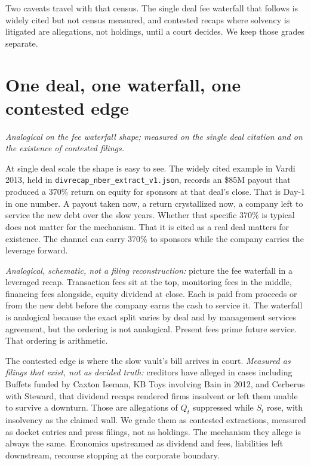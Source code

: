 Two caveats travel with that census. The single deal fee waterfall that follows is widely cited but not census measured, and contested recaps where solvency is litigated are allegations, not holdings, until a court decides. We keep those grades separate.

\section{One deal, one waterfall, one contested edge}

\textit{Analogical on the fee waterfall shape; measured on the single deal citation and on the existence of contested filings.}

At single deal scale the shape is easy to see. The widely cited example in Vardi 2013, held in \texttt{divrecap\_nber\_extract\_v1.json}, records an \$85M payout that produced a 370\% return on equity for sponsors at that deal's close. That is Day-1 in one number. A payout taken now, a return crystallized now, a company left to service the new debt over the slow years. Whether that specific 370\% is typical does not matter for the mechanism. That it is cited as a real deal matters for existence. The channel can carry 370\% to sponsors while the company carries the leverage forward.

\textit{Analogical, schematic, not a filing reconstruction:} picture the fee waterfall in a leveraged recap. Transaction fees sit at the top, monitoring fees in the middle, financing fees alongside, equity dividend at close. Each is paid from proceeds or from the new debt before the company earns the cash to service it. The waterfall is analogical because the exact split varies by deal and by management services agreement, but the ordering is not analogical. Present fees prime future service. That ordering is arithmetic.

The contested edge is where the slow vault's bill arrives in court. \textit{Measured as filings that exist, not as decided truth:} creditors have alleged in cases including Buffets funded by Caxton Iseman, KB Toys involving Bain in 2012, and Cerberus with Steward, that dividend recaps rendered firms insolvent or left them unable to survive a downturn. Those are allegations of $Q_t$ suppressed while $S_t$ rose, with insolvency as the claimed wall. We grade them as contested extractions, measured as docket entries and press filings, not as holdings. The mechanism they allege is always the same. Economics upstreamed as dividend and fees, liabilities left downstream, recourse stopping at the corporate boundary.

